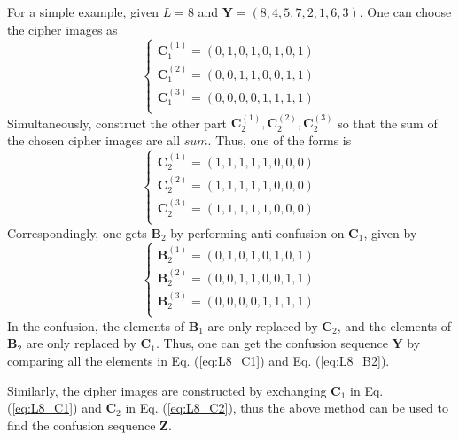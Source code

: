 \documentclass[final,3p,times,twocolumn]{elsarticle}
\begin{document}
For a simple example, given $L=8$ and $\bm{Y}=(8,4,5,7,2,1,6,3)$. One can choose the cipher images as
\begin{equation}
	\left\{ \begin{array}{l}
		\bm{C}_1^{(1)} = (0,1,0,1,0,1,0,1) \\
		\bm{C}_1^{(2)} = (0,0,1,1,0,0,1,1) \\
		\bm{C}_1^{(3)} = (0,0,0,0,1,1,1,1) \\
	\end{array} \right.
	\label{eq:L8_C1}
\end{equation}
Simultaneously, construct the other part $\bm{C}_2^{(1)},\bm{C}_2^{(2)},\bm{C}_2^{(3)}$ so that the sum of the chosen cipher images are all $sum$. Thus, one of the forms is
\begin{equation}
	\left\{ \begin{array}{l}
		\bm{C}_2^{(1)} = (1,1,1,1,1,0,0,0) \\
		\bm{C}_2^{(2)} = (1,1,1,1,1,0,0,0) \\
		\bm{C}_2^{(3)} = (1,1,1,1,1,0,0,0) \\
	\end{array} \right.
	\label{eq:L8_C2}
\end{equation}
Correspondingly, one gets $\bm{B}_2$ by performing anti-confusion on $\bm{C}_1$, given by
\begin{equation}
\left\{ \begin{array}{l}
\bm{B}_2^{(1)} = (0,1,0,1,0,1,0,1) \\
\bm{B}_2^{(2)} = (0,0,1,1,0,0,1,1) \\
\bm{B}_2^{(3)} = (0,0,0,0,1,1,1,1) \\
\end{array} \right.
\label{eq:L8_B2}
\end{equation}
In the confusion, the elements of $\bm{B}_1$ are only replaced by $\bm{C}_2$, and the elements of $\bm{B}_2$ are only replaced by $\bm{C}_1$. Thus, one can get the confusion sequence $\bm{Y}$ by comparing all the elements in Eq. (\ref{eq:L8_C1}) and Eq. (\ref{eq:L8_B2}).

Similarly, the cipher images are constructed by exchanging $\bm{C}_1$ in Eq. (\ref{eq:L8_C1}) and $\bm{C}_2$ in Eq. (\ref{eq:L8_C2}), thus the above method can be used to find the confusion sequence $\bm{Z}$.
\end{document}
